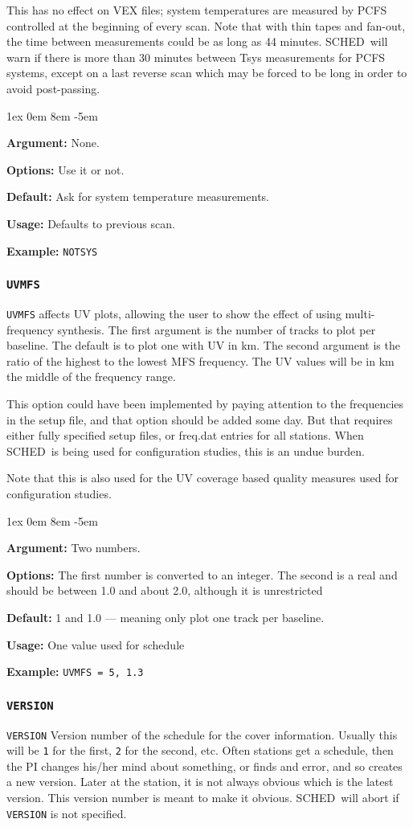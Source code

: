 \documentclass{report}
\newcommand{\schedb}{{\sc SCHED~}}
\newcommand{\rcwbox}[5]{
  \begin{list}{}{\parsep 1ex  \itemsep 0em
                 \leftmargin 8em  \itemindent -5em }
    \item {\bf Argument:} #1
    \item {\bf Options:}  #2
    \item {\bf Default:}  #3
    \item {\bf Usage:}    #4
    \item {\bf Example:}  #5
  \end{list}
}
\begin{document}
This has no effect on VEX files; system temperatures are measured by
PCFS controlled at the beginning of every scan. Note that with thin
tapes and fan-out, the time between measurements could be as long as 44
minutes. \schedb will warn if there is more than 30 minutes between
Tsys measurements for PCFS systems, except on a last reverse scan which
may be forced to be long in order to avoid post-passing.

\rcwbox
{None.}
{Use it or not.}
{Ask for system temperature measurements.}
{Defaults to previous scan.}
{{\tt NOTSYS}}


\subsubsection{\label{MP:UVMFS}{\tt UVMFS}}

{\tt UVMFS} affects UV plots, allowing the user to show the effect
of using multi-frequency synthesis.  The first argument is the
number of tracks to plot per baseline.  The default is to plot one
with UV in km.  The second argument is the ratio of the highest
to the lowest MFS frequency.  The UV values will be in km the
middle of the frequency range.

This option could have been implemented by paying attention to
the frequencies in the setup file, and that option should be
added some day.  But that requires either fully specified setup
files, or freq.dat entries for all stations.  When \schedb is being
used for configuration studies, this is an undue burden.

Note that this is also used for the UV coverage based quality
measures used for configuration studies.

\rcwbox
{Two numbers.}
{The first number is converted to an integer.  The second is a real
and should be between 1.0 and about 2.0, although it is unrestricted}
{1 and 1.0 --- meaning only plot one track per baseline.}
{One value used for schedule}
{{\tt UVMFS = 5, 1.3 }}



\subsubsection{\label{MP:VERSION}{\tt VERSION}}

{\tt VERSION} Version number of the schedule for the cover
information. Usually this will be {\tt 1} for the first, {\tt 2} for
the second, etc. Often stations get a schedule, then the PI changes
his/her mind about something, or finds and error, and so creates a new
version. Later at the station, it is not always obvious which is the
latest version.  This version number is meant to make it
obvious. \schedb will abort if {\tt VERSION} is not specified.
\end{document}
